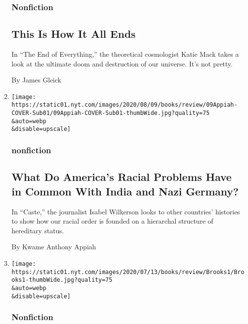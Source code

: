 \begin{enumerate}
  \hypertarget{nonfiction-10}{%
  \subsubsection{Nonfiction}\label{nonfiction-10}}

  \hypertarget{this-is-how-it-all-ends}{%
  \subsection{This Is How It All Ends}\label{this-is-how-it-all-ends}}

  In ``The End of Everything,'' the theoretical cosmologist Katie Mack
  takes a look at the ultimate doom and destruction of our universe.
  It's not pretty.

  By James Gleick
\item
  \href{/2020/08/04/books/review/caste-isabel-wilkerson.html}{}

  \texttt{[image: https://static01.nyt.com/images/2020/08/09/books/review/09Appiah-COVER-Sub01/09Appiah-COVER-Sub01-thumbWide.jpg?quality=75\\\&auto=webp\\\&disable=upscale]}

  \hypertarget{nonfiction-11}{%
  \subsubsection{nonfiction}\label{nonfiction-11}}

  \hypertarget{what-do-americas-racial-problems-have-in-common-with-india-and-nazi-germany}{%
  \subsection{What Do America's Racial Problems Have in Common With
  India and Nazi
  Germany?}\label{what-do-americas-racial-problems-have-in-common-with-india-and-nazi-germany}}

  In ``Caste,'' the journalist Isabel Wilkerson looks to other
  countries' histories to show how our racial order is founded on a
  hierarchal structure of hereditary status.

  By Kwame Anthony Appiah
\item
  \href{/2020/08/04/books/review/inferno-catherine-cho.html}{}

  \texttt{[image: https://static01.nyt.com/images/2020/07/13/books/review/Brooks1/Brooks1-thumbWide.jpg?quality=75\\\&auto=webp\\\&disable=upscale]}

  \hypertarget{nonfiction-12}{%
  \subsubsection{Nonfiction}\label{nonfiction-12}}


\end{enumerate}
